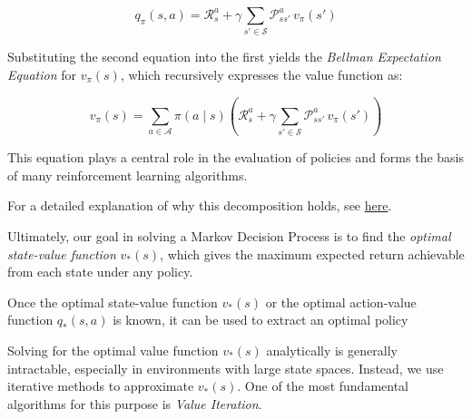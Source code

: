 \documentclass[12pt]{extreport}
\theoremstyle{definition}
\begin{document}
\[
q_\pi(s, a) = \mathcal{R}_s^a + \gamma \sum_{s' \in \mathcal{S}} \mathcal{P}^a_{ss'} \, v_\pi(s')
\]

\noindent Substituting the second equation into the first yields the \textit{Bellman Expectation Equation} for \( v_\pi(s) \), which recursively expresses the value function as:

\[
v_\pi(s) = \sum_{a \in \mathcal{A}} \pi(a \mid s) \left( \mathcal{R}_s^a + \gamma \sum_{s' \in \mathcal{S}} \mathcal{P}^a_{ss'} \, v_\pi(s') \right)
\]

\noindent This equation plays a central role in the evaluation of policies and forms the basis of many reinforcement learning algorithms.

\medskip

\noindent For a detailed explanation of why this decomposition holds, see  
\href{https://www.deeplearningwizard.com/deep_learning/deep_reinforcement_learning_pytorch/bellman_mdp/#bellman-expectation-equations}{here}.


\bigskip

\noindent Ultimately, our goal in solving a Markov Decision Process is to find the \textit{optimal state-value function} \( v_*(s) \), which gives the maximum expected return achievable from each state under any policy.

\begin{center}
\end{center}


\noindent Once the optimal state-value function \( v_*(s) \) or the optimal action-value function \( q_*(s, a) \) is known, it can be used to extract an optimal policy

\bigskip

\noindent Solving for the optimal value function \( v_*(s) \) analytically is generally intractable, especially in environments with large state spaces. Instead, we use iterative methods to approximate \( v_*(s) \). One of the most fundamental algorithms for this purpose is \textit{Value Iteration}.
\end{document}
